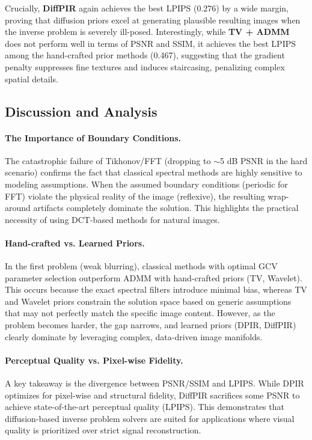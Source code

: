 \documentclass[12pt, a4paper, onecolumn]{article}
\theoremstyle{plain}          %
\theoremstyle{definition}     %
\theoremstyle{remark}
\begin{document}
Crucially, \textbf{DiffPIR} again achieves the best LPIPS (0.276) by a wide margin, proving that diffusion priors excel at generating plausible resulting images when the inverse problem is severely ill-posed. Interestingly, while \textbf{TV + ADMM} does not perform well in terms of PSNR and SSIM, it achieves the best LPIPS among the hand-crafted prior methods (0.467), suggesting that the gradient penalty suppresses fine textures and induces staircasing, penalizing complex spatial details.

\subsection{Discussion and Analysis}
\label{sec:discussion}

\paragraph{The Importance of Boundary Conditions.}
The catastrophic failure of Tikhonov/FFT (dropping to $\sim$5 dB PSNR in the hard scenario) confirms the fact that classical spectral methods are highly sensitive to modeling assumptions. When the assumed boundary conditions (periodic for FFT) violate the physical reality of the image (reflexive), the resulting wrap-around artifacts completely dominate the solution. This highlights the practical necessity of using DCT-based methods for natural images.

\paragraph{Hand-crafted vs. Learned Priors.}
In the first problem (weak blurring), classical methods with optimal GCV parameter selection outperform ADMM with hand-crafted priors (TV, Wavelet). This occurs because the exact spectral filters introduce minimal bias, whereas TV and Wavelet priors constrain the solution space based on generic assumptions that may not perfectly match the specific image content. However, as the problem becomes harder, the gap narrows, and learned priors (DPIR, DiffPIR) clearly dominate by leveraging complex, data-driven image manifolds.

\paragraph{Perceptual Quality vs. Pixel-wise Fidelity.}
A key takeaway is the divergence between PSNR/SSIM and LPIPS. While DPIR optimizes for pixel-wise and structural fidelity, DiffPIR sacrifices some PSNR to achieve state-of-the-art perceptual quality (LPIPS). This demonstrates that diffusion-based inverse problem solvers are suited for applications where visual quality is prioritized over strict signal reconstruction.
\end{document}
